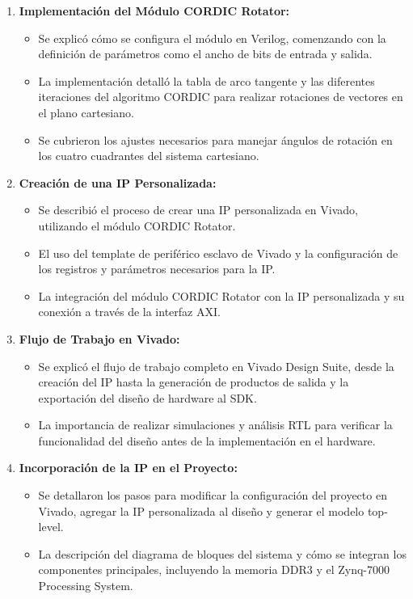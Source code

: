 \documentclass[12pt,a4paper, twoside]{article} %
\begin{document}
\begin{enumerate}
    \item \textbf{Implementación del Módulo CORDIC Rotator:}
    \begin{itemize}
        \item Se explicó cómo se configura el módulo en Verilog, comenzando con la definición de parámetros como el ancho de bits de entrada y salida.
        \item La implementación detalló la tabla de arco tangente y las diferentes iteraciones del algoritmo CORDIC para realizar rotaciones de vectores en el plano cartesiano.
        \item Se cubrieron los ajustes necesarios para manejar ángulos de rotación en los cuatro cuadrantes del sistema cartesiano.
    \end{itemize}
    
    \item \textbf{Creación de una IP Personalizada:}
    \begin{itemize}
        \item Se describió el proceso de crear una IP personalizada en Vivado, utilizando el módulo CORDIC Rotator.
        \item El uso del template de periférico esclavo de Vivado y la configuración de los registros y parámetros necesarios para la IP.
        \item La integración del módulo CORDIC Rotator con la IP personalizada y su conexión a través de la interfaz AXI.
    \end{itemize}
    
    \item \textbf{Flujo de Trabajo en Vivado:}
    \begin{itemize}
        \item Se explicó el flujo de trabajo completo en Vivado Design Suite, desde la creación del IP hasta la generación de productos de salida y la exportación del diseño de hardware al SDK.
        \item La importancia de realizar simulaciones y análisis RTL para verificar la funcionalidad del diseño antes de la implementación en el hardware.
    \end{itemize}
    
    \item \textbf{Incorporación de la IP en el Proyecto:}
    \begin{itemize}
        \item Se detallaron los pasos para modificar la configuración del proyecto en Vivado, agregar la IP personalizada al diseño y generar el modelo top-level.
        \item La descripción del diagrama de bloques del sistema y cómo se integran los componentes principales, incluyendo la memoria DDR3 y el Zynq-7000 Processing System.
    \end{itemize}
    

\end{enumerate}
\end{document}
